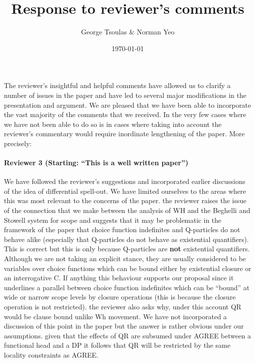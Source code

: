\documentclass[11pt]{article}
\begin{document}
\title{Response to reviewer's comments}
\author{George Tsoulas \& Norman Yeo}
\date{\today}

\maketitle


The reviewer's insightful and helpful comments have allowed us to clarify a number of issues in the paper and have led to several major modifications in the presentation and argument.  We are pleased that we have been able to incorporate the vast majority of the comments that we received.  In the very few cases where we have not been able to do so is in cases where taking into account the reviewer's commentary would require inordinate lengthening of the paper.  More precisely:

\paragraph{Reviewer 3 (Starting: ``This is a well written paper'')}  We have followed the reviewer's suggestions and incorporated earlier discussions of the idea of differential spell-out.  We have limited ourselves to the areas where this was most relevant to the concerns of the paper.  the reviewer raises the issue of the connection that we make between the analysis of WH and the Beghelli and Stowell system for scope and suggests that it may be problematic in the framework of the paper that choice function  indefinites and Q-particles do not behave alike (especially that Q-particles do not behave as existential quantifiers).  This is correct but this is only because Q-particles are \textbf{not} existential quantifiers.  Although we are not taking an explicit stance, they are usually considered to be variables over choice functions which can be bound either by existential closure or an interrogative C.  If anything this behaviour supports our proposal since it underlines a parallel between choice function indefinites which can be ``bound'' at wide or narrow scope levels by closure operations (this is because the closure operation is not restricted).
the reviewer also asks why, under this account QR would be clause bound unlike Wh movement.  We have not incorporated a discussion of this point in the paper but the answer is rather obvious under our assumptions.  given that the effects of QR are subsumed under AGREE between a functional head and a DP it follows that QR will be restricted by the same locality constraints as AGREE.
\end{document}
